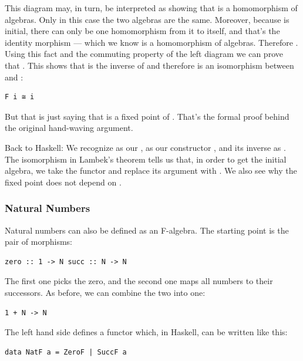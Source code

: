 This diagram may, in turn, be interpreted as showing that
 is a homomorphism of algebras. Only in this case the
two algebras are the same. Moreover, because  is
initial, there can only be one homomorphism from it to itself, and
that's the identity morphism  --- which we know is a
homomorphism of algebras. Therefore . Using this
fact and the commuting property of the left diagram we can prove that
. This shows that  is the inverse of
 and therefore  is an isomorphism between
 and :

\begin{verbatim}
F i ≅ i
\end{verbatim}

But that is just saying that  is a fixed point of .
That's the formal proof behind the original hand-waving argument.

Back to Haskell: We recognize  as our ,
 as our constructor , and its inverse as
. The isomorphism in Lambek's theorem tells us that, in
order to get the initial algebra, we take the functor  and
replace its argument  with . We also see why
the fixed point does not depend on .

\subsubsection{Natural Numbers}\label{natural-numbers}

Natural numbers can also be defined as an F-algebra. The starting point
is the pair of morphisms:

\begin{verbatim}
zero :: 1 -> N succ :: N -> N
\end{verbatim}

The first one picks the zero, and the second one maps all numbers to
their successors. As before, we can combine the two into one:

\begin{verbatim}
1 + N -> N
\end{verbatim}

The left hand side defines a functor which, in Haskell, can be written
like this:

\begin{verbatim}
data NatF a = ZeroF | SuccF a
\end{verbatim}

